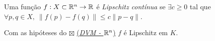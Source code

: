 \begin{definition}
    Uma função \(f:X\subset \mathbb{R}^n\to \mathbb{R} \) é \emph{Lipschitz contínua} se \(\exists c\geq 0\) tal que \(\forall p,q \in X, \ \|f(p)-f(q)\|\leq c \|p-q\|\). 
\end{definition}
\begin{corollary}
   Com as hipóteses do {\scriptsize \(\boxtimes\)} \hyperlink{corDVMRn}{(\emph{DVM - \(\mathbb{R}^n\)})} \(f\) é Lipschitz em \(K\). 
\end{corollary}

